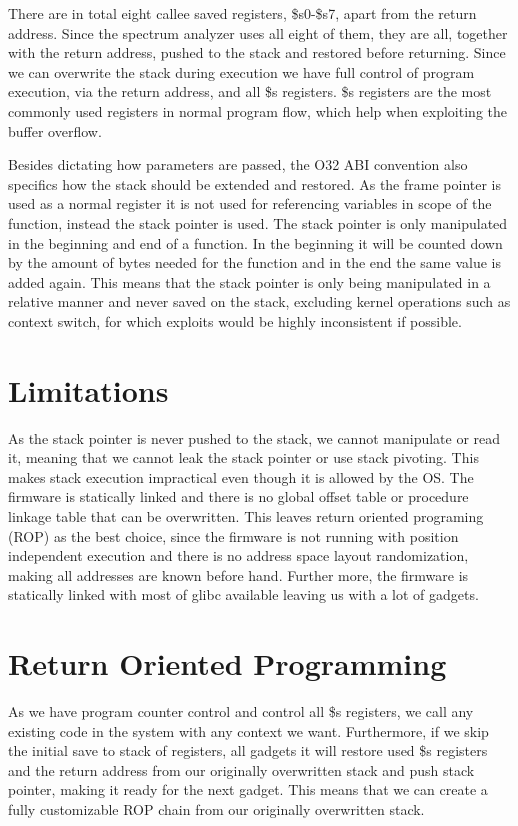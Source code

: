 There are in total eight callee saved registers, \$s0-\$s7, apart from the return address. Since the spectrum analyzer uses all eight of them, they are all, together with the return address, pushed to the stack and restored before returning. Since we can overwrite the stack during execution we have full control of program execution, via the return address, and all \$s registers. \$s registers are the most commonly used registers in normal program flow, which help when exploiting the buffer overflow.

Besides dictating how parameters are passed, the O32 ABI convention also specifics how the stack should be extended and restored. As the frame pointer is used as a normal register it is not used for referencing variables in scope of the function, instead the stack pointer is used. The stack pointer is only manipulated in the beginning and end of a function. In the beginning it will be counted down by the amount of bytes needed for the function and in the end the same value is added again. This means that the stack pointer is only being manipulated in a relative manner and never saved on the stack, excluding kernel operations such as context switch, for which exploits would be highly inconsistent if possible.

\section{Limitations}
As the stack pointer is never pushed to the stack, we cannot manipulate or read it, meaning that we cannot leak the stack pointer or use stack pivoting. This makes stack execution impractical even though it is allowed by the OS. The firmware is statically linked and there is no global offset table or procedure linkage table that can be overwritten. This leaves return oriented programing (ROP) as the best choice, since the firmware is not running with position independent execution and there is no address space layout randomization, making all addresses are known before hand. Further more, the firmware is statically linked with most of glibc available leaving us with a lot of gadgets.

\section{Return Oriented Programming}
\label{sec:return_sriented_rrogramming}
As we have program counter control and control all \$s registers, we call any existing code in the system with any context we want. Furthermore, if we skip the initial save to stack of registers, all gadgets it will restore used \$s registers and the return address from our originally overwritten stack and push stack pointer, making it ready for the next gadget. This means that we can create a fully customizable ROP chain from our originally overwritten stack.

